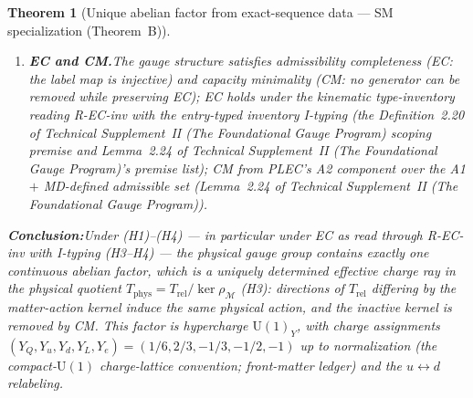 \documentclass[11pt]{article}
\newtheorem{theorem}{Theorem}[section]
\theoremstyle{definition}
\newcommand{\U}{\mathrm{U}}
\newcommand{\TSII}{Technical Supplement~II (\emph{The Foundational Gauge Program})}
\begin{document}
\begin{theorem}[Unique abelian factor from exact-sequence data ---
SM specialization (Theorem~B)]
\begin{enumerate}[label=(H\arabic*),nosep]
  so any torus action factoring through those invariants gives
  $Y_u = Y_d$ on every direction --- the hypercharge ray does not lie
  in that image.  Antecedently distinct types (clause one) must
  therefore carry antecedently distinct central characters (clause
  two) for the closure below to go through; generation universality
  (C3 of Theorem~\ref{thm:conditional_classification}) is part of the
  same clause --- $c$ is a function of type, acting identically on the
  three generation copies.  One further definition fixes where the
  uniqueness claim lives: let $\rho_{\mathcal{M}}$ be the matter
  action defined by $c$, and
  $T_{\mathrm{phys}} := T_{\mathrm{rel}} / \ker\rho_{\mathcal{M}}$
  the \emph{physical quotient}.  Torus directions differing by
  $\ker\rho_{\mathcal{M}}$ induce the same charges on every
  multiplet, so no property of $c$ can distinguish them --- if $c$ has
  a kernel direction, entire families of one-dimensional subgroups of
  $T_{\mathrm{rel}}$ realize the same physical action.  The closure's
  uniqueness claim is therefore made for the \emph{effective charge
  ray in} $T_{\mathrm{phys}}$; the kernel itself is an inactive
  direction (zero admissibility information) and is removed by CM.
  \item \textbf{EC and CM.}\quad The gauge structure satisfies
  admissibility completeness (EC: the label map is injective) and
  capacity minimality (CM: no generator can be removed while
  preserving EC); EC holds under the kinematic type-inventory reading
  R-EC-inv with the entry-typed inventory I-typing (the
  Definition~2.20 of \TSII{} scoping premise and
  Lemma~2.24 of \TSII{}'s premise list); CM from PLEC's A2
  component over the A1 $+$ MD-defined admissible set
  (Lemma~2.24 of \TSII{}).
\end{enumerate}

\smallskip\noindent\textbf{Conclusion:}\quad Under (H1)--(H4) --- in
particular under EC as read through R-EC-inv with I-typing (H3--H4)
--- the physical gauge group
contains exactly one continuous abelian factor, which is a uniquely
determined \emph{effective charge ray in the physical quotient}
$T_{\mathrm{phys}} = T_{\mathrm{rel}} / \ker\rho_{\mathcal{M}}$
(H3): directions of $T_{\mathrm{rel}}$ differing by the matter-action
kernel induce the same physical action, and the inactive kernel is
removed by CM.  This factor is hypercharge $\U(1)_Y$, with charge
assignments $(Y_Q, Y_u, Y_d, Y_L, Y_e) =
(1/6, 2/3, -1/3, -1/2, -1)$ up to normalization (the compact-$\U(1)$
charge-lattice convention; front-matter ledger) and the
$u \leftrightarrow d$ relabeling.


\end{theorem}
\end{document}
